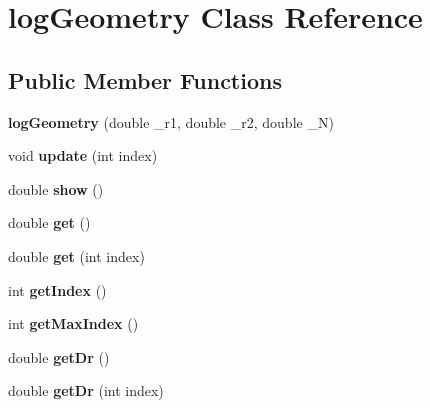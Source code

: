 \hypertarget{classlogGeometry}{\section{log\-Geometry Class Reference}
\label{classlogGeometry}
}
\subsection*{Public Member Functions}
\begin{DoxyCompactItemize}
\item 
\hypertarget{classlogGeometry_acbe7e42d84d706ca2e393931354e4f80}{{\bfseries log\-Geometry} (double \-\_\-r1, double \-\_\-r2, double \-\_\-\-N)}\label{classlogGeometry_acbe7e42d84d706ca2e393931354e4f80}

\item 
\hypertarget{classlogGeometry_a6bd19dfc09f969fec401802fd0a33c20}{void {\bfseries update} (int index)}\label{classlogGeometry_a6bd19dfc09f969fec401802fd0a33c20}

\item 
\hypertarget{classlogGeometry_afb47230469268443d3ba07a516522e1d}{double {\bfseries show} ()}\label{classlogGeometry_afb47230469268443d3ba07a516522e1d}

\item 
\hypertarget{classlogGeometry_aa76e4cd005253fb843e560fe84f07b97}{double {\bfseries get} ()}\label{classlogGeometry_aa76e4cd005253fb843e560fe84f07b97}

\item 
\hypertarget{classlogGeometry_a344599f7790e01d64dea6da88d5d78bb}{double {\bfseries get} (int index)}\label{classlogGeometry_a344599f7790e01d64dea6da88d5d78bb}

\item 
\hypertarget{classlogGeometry_af214c858d7d96eb6e4233cb310112f08}{int {\bfseries get\-Index} ()}\label{classlogGeometry_af214c858d7d96eb6e4233cb310112f08}

\item 
\hypertarget{classlogGeometry_a98c824014ee3b73d81251b9c17667ebb}{int {\bfseries get\-Max\-Index} ()}\label{classlogGeometry_a98c824014ee3b73d81251b9c17667ebb}

\item 
\hypertarget{classlogGeometry_a5db13e9f817b91ce4e618a28c716b93c}{double {\bfseries get\-Dr} ()}\label{classlogGeometry_a5db13e9f817b91ce4e618a28c716b93c}

\item 
\hypertarget{classlogGeometry_a42413b8e326afeef7cd6fa57ca99732c}{double {\bfseries get\-Dr} (int index)}\label{classlogGeometry_a42413b8e326afeef7cd6fa57ca99732c}


\end{DoxyCompactItemize}
